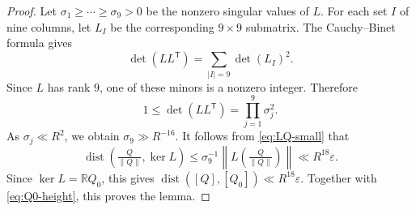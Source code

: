 \documentclass[10pt,a4paper]{amsart}
\begin{document}
\begin{proof}
Let $\sigma_1\ge\cdots\ge\sigma_9>0$ be the nonzero singular values of
$L$. For each set $I$ of nine columns, let $L_I$ be the corresponding
$9\times9$ submatrix. The Cauchy--Binet formula gives
$$
\det(LL^{\mathsf T})
=
\sum_{|I|=9}\det(L_I)^2.
$$
Since $L$ has rank $9$, one of these minors is a nonzero integer. Therefore
$$
1
\le
\det(LL^{\mathsf T})
=
\prod_{j=1}^9\sigma_j^2.
$$
As $\sigma_j\ll R^2$, we obtain $\sigma_9\gg R^{-16}$. It follows from
\eqref{eq:LQ-small} that
$$
\operatorname{dist}
\left(
\tfrac{Q}{\|Q\|},\ker L
\right)
\le
\sigma_9^{-1}
\left\|
L\left(\tfrac{Q}{\|Q\|}\right)
\right\|
\ll
R^{18}\varepsilon.
$$
Since $\ker L=\mathbb RQ_0$, this gives
$
\operatorname{dist}([Q],[Q_0])
\ll
R^{18}\varepsilon.
$
Together with \eqref{eq:Q0-height}, this proves the lemma.
\end{proof}
\end{document}
